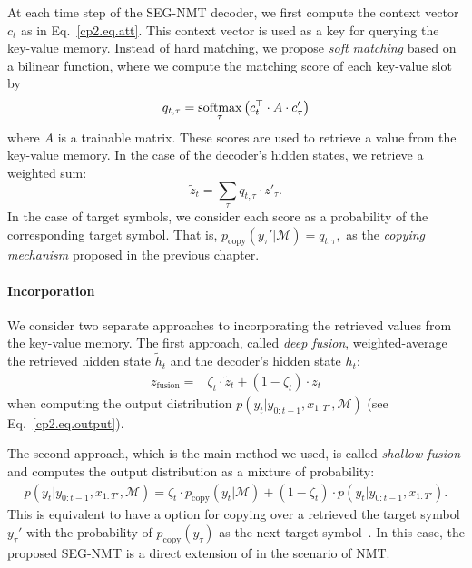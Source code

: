 At each time step of the SEG-NMT decoder, we first compute the context vector $c_t$ as in Eq.~\eqref{cp2.eq.att}. This context vector is used as a key for querying the key-value memory. Instead of hard matching, we propose {\it soft matching} based on a bilinear function, where we compute the matching score of each key-value slot by
\begin{equation}
\label{cp4.eq.score}
	q_{t, \tau}  = \mathop{\operatorname{\text{softmax}}}\limits_{\tau}\left(c_t^{\top}\cdot A \cdot c'_\tau\right)
\end{equation}
where $A$ is a trainable matrix. 
These scores are used to retrieve a value from the key-value memory. In the case of the decoder's hidden states, we retrieve a weighted sum:
\begin{equation}
	\tilde{z}_t = \sum_{\tau} q_{t, \tau} \cdot z'_{\tau}.
\end{equation}
In the case of target symbols, we consider each  score as a probability of the corresponding target symbol. That is,
$p_{\text{copy}}(y_{\tau}'|\mathcal{M}) = q_{t, \tau},$ as the {\it copying mechanism} proposed in the previous chapter.



\paragraph{Incorporation}

We consider two separate approaches to incorporating the retrieved values from the key-value memory. The first approach, called {\it deep fusion}, weighted-average the retrieved hidden state $\tilde{h}_t$ and the decoder's hidden state $h_t$:
\begin{align}
\label{cp4.eq.deep}
z_{\text{fusion}} = &\zeta_t \cdot \tilde{z}_t + (1 -\zeta_t) \cdot z_t 
\end{align}
when computing the output distribution $p(y_t|y_{0:t-1}, x_{1:T'},\mathcal{M})$ (see Eq.~\eqref{cp2.eq.output}). 

The second approach, which is the main method we used, is called {\it shallow fusion} and computes the output distribution as a mixture of probability:
\begin{align}
\label{cp4.eq.shallow}
p(y_t| y_{0:t-1}, x_{1:T'}, \mathcal{M}) = \zeta_t \cdot p_{\text{copy}}(y_t|\mathcal{M}) + (1-\zeta_t) \cdot p(y_t|y_{0:t-1}, x_{1:T'}).
\end{align}
This is equivalent to have a option for copying over a retrieved the target symbol $y_{\tau}'$ with the probability of $ p_{\text{copy}}(y_{\tau})$ as the next target symbol~\citep{gu2016incorporating}. In this case, the proposed SEG-NMT is a direct extension of \copynet  in the scenario of NMT. %

